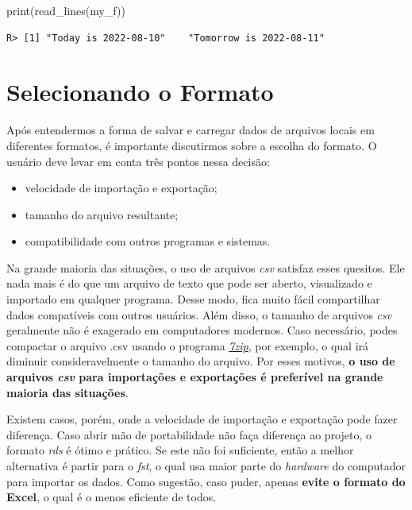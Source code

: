 \documentclass[
  11pt,
]{book}
\newenvironment{Shaded}{\begin{snugshade}}{\end{snugshade}}
\newcommand{\FunctionTok}[1]{\textcolor[rgb]{0,0,0}{#1}}
\newcommand{\NormalTok}[1]{#1}
\providecommand{\tightlist}{%
  \setlength{\itemsep}{0pt}\setlength{\parskip}{0pt}}
\begin{document}
\begin{Shaded}
\begin{Highlighting}[]
\FunctionTok{print}\NormalTok{(}\FunctionTok{read\_lines}\NormalTok{(my\_f))}
\end{Highlighting}
\end{Shaded}

\begin{verbatim}
R> [1] "Today is 2022-08-10"    "Tomorrow is 2022-08-11"
\end{verbatim}

\hypertarget{selecionando-o-formato}{%
\section{Selecionando o Formato}\label{selecionando-o-formato}}

Após entendermos a forma de salvar e carregar dados de arquivos locais em diferentes formatos, é importante discutirmos sobre a escolha do formato. O usuário deve levar em conta três pontos nessa decisão:

\begin{itemize}
\tightlist
\item
  velocidade de importação e exportação;
\item
  tamanho do arquivo resultante;
\item
  compatibilidade com outros programas e sistemas.
\end{itemize}

Na grande maioria das situações, o uso de arquivos \emph{csv} satisfaz esses quesitos. Ele nada mais é do que um arquivo de texto que pode ser aberto, visualizado e importado em qualquer programa. Desse modo, fica muito fácil compartilhar dados compatíveis com outros usuários. Além disso, o tamanho de arquivos \emph{csv} geralmente não é exagerado em computadores modernos. Caso necessário, podes compactar o arquivo .csv usando o programa \href{https://www.7-zip.org/}{\emph{7zip}}, por exemplo, o qual irá diminuir consideravelmente o tamanho do arquivo. Por esses motivos, \textbf{o uso de arquivos \emph{csv} para importações e exportações é preferível na grande maioria das situações}. 

Existem casos, porém, onde a velocidade de importação e exportação pode fazer diferença. Caso abrir mão de portabilidade não faça diferença ao projeto, o formato \emph{rds} é ótimo e prático. Se este não foi suficiente, então a melhor alternativa é partir para o \emph{fst}, o qual usa maior parte do \emph{hardware} do computador para importar os dados. Como sugestão, caso puder, apenas \textbf{evite o formato do Excel}, o qual é o menos eficiente de todos.
\end{document}
